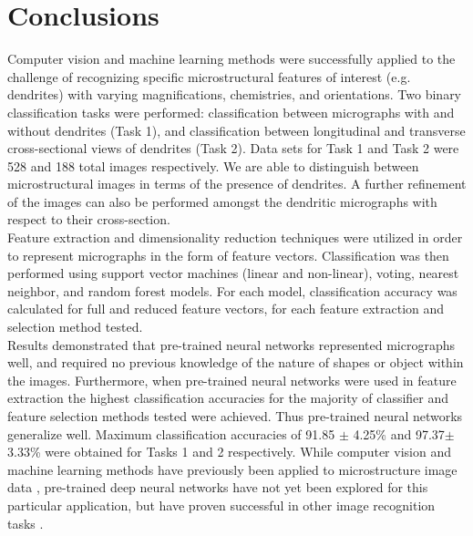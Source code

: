 \section{Conclusions}
\label{conclusions}

Computer vision and machine learning methods were successfully applied to the challenge of recognizing specific microstructural features of interest (e.g. dendrites) with varying magnifications, chemistries, and orientations.
%
Two binary classification tasks were performed: classification between micrographs with and without dendrites (Task 1), and classification between longitudinal and transverse cross-sectional views of dendrites (Task 2).  Data sets for Task 1 and Task 2 were 528 and 188 total images respectively. We are able to distinguish between microstructural images in terms of the presence of dendrites. A further refinement of the images can also be performed amongst the dendritic micrographs with respect to their cross-section. %
%
\\
Feature extraction and dimensionality reduction techniques were utilized in order to represent micrographs in the form of feature vectors.  Classification was then performed using support vector machines (linear and non-linear), voting, nearest neighbor, and random forest models.
%
For each model, classification accuracy was calculated for full and reduced feature vectors, for each feature extraction and selection method tested. 
\\

Results demonstrated that pre-trained neural networks represented micrographs well, and required no previous knowledge of the nature of shapes or object within the images. Furthermore, when pre-trained neural networks were used in feature extraction the highest classification accuracies for the majority of classifier and feature selection methods tested were achieved. Thus pre-trained neural networks generalize well. 
%
Maximum classification accuracies of 91.85 $\pm$ 4.25\% and 97.37$\pm$ 3.33\% were obtained for Tasks 1 and 2 respectively. 
%
While computer vision and machine learning methods have previously been applied to microstructure image data \cite{DeCost2015, Impoco2015, XuH2015, Bostanabad2016, Taffese2015}, pre-trained deep neural networks have not yet been explored for this particular application, but have proven successful in other image recognition tasks \cite{Guo2016}.  \\

